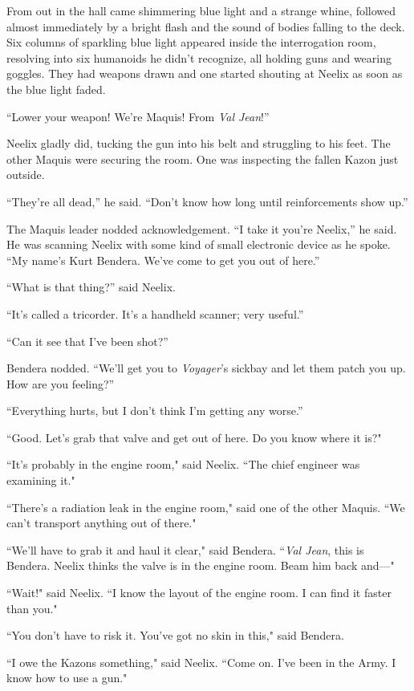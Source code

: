 \documentclass[twoside,letterpaper,12pt]{memoir}
\begin{document}
From out in the hall came shimmering blue light and a strange whine, followed almost immediately by a bright flash and the sound of bodies falling to the deck. Six columns of sparkling blue light appeared inside the interrogation room, resolving into six humanoids he didn’t recognize, all holding guns and wearing goggles. They had weapons drawn and one started shouting at Neelix as soon as the blue light faded.

``Lower your weapon! We’re Maquis! From \textit{Val Jean}!”

Neelix gladly did, tucking the gun into his belt and struggling to his feet. The other Maquis were securing the room. One was inspecting the fallen Kazon just outside.

``They’re all dead,” he said. ``Don’t know how long until reinforcements show up.”

The Maquis leader nodded acknowledgement. ``I take it you’re Neelix,” he said. He was scanning Neelix with some kind of small electronic device as he spoke. ``My name’s Kurt Bendera. We’ve come to get you out of here.”

``What is that thing?” said Neelix.

``It’s called a tricorder. It’s a handheld scanner; very useful.”

``Can it see that I’ve been shot?”

Bendera nodded. ``We’ll get you to \textit{Voyager}’s sickbay and let them patch you up. How are you feeling?”

``Everything hurts, but I don’t think I’m getting any worse.”

``Good. Let's grab that valve and get out of here. Do you know where it is?"

``It's probably in the engine room," said Neelix. ``The chief engineer was examining it."

``There's a radiation leak in the engine room," said one of the other Maquis. ``We can't transport anything out of there."

``We'll have to grab it and haul it clear," said Bendera. ``\textit{Val Jean}, this is Bendera. Neelix thinks the valve is in the engine room. Beam him back and---"

``Wait!" said Neelix. ``I know the layout of the engine room. I can find it faster than you."

``You don't have to risk it. You've got no skin in this," said Bendera.

``I owe the Kazons something," said Neelix. ``Come on. I've been in the Army. I know how to use a gun."
\end{document}
